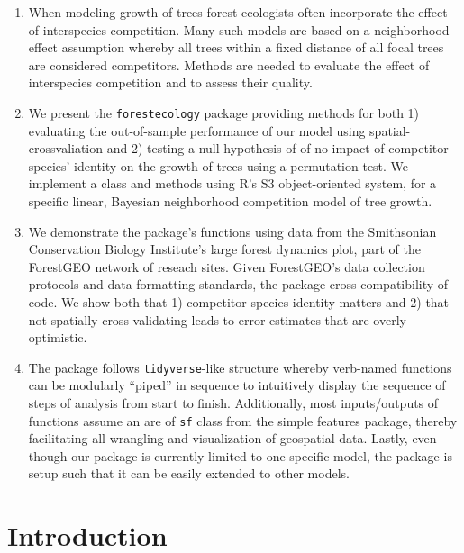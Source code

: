 \documentclass[12pt]{article}
\providecommand{\tightlist}{%
  \setlength{\itemsep}{0pt}\setlength{\parskip}{0pt}}
\begin{document}
\begin{enumerate}
\def\labelenumi{\arabic{enumi}.}
\tightlist
\item
  When modeling growth of trees forest ecologists often incorporate the
  effect of interspecies competition. Many such models are based on a
  neighborhood effect assumption whereby all trees within a fixed
  distance of all focal trees are considered competitors. Methods are
  needed to evaluate the effect of interspecies competition and to
  assess their quality.
\item
  We present the \texttt{forestecology} package providing methods for
  both 1) evaluating the out-of-sample performance of our model using
  spatial-crossvaliation and 2) testing a null hypothesis of of no
  impact of competitor species' identity on the growth of trees using a
  permutation test. We implement a class and methods using R's S3
  object-oriented system, for a specific linear, Bayesian neighborhood
  competition model of tree growth.
\item
  We demonstrate the package's functions using data from the Smithsonian
  Conservation Biology Institute's large forest dynamics plot, part of
  the ForestGEO network of reseach sites. Given ForestGEO's data
  collection protocols and data formatting standards, the package
  cross-compatibility of code. We show both that 1) competitor species
  identity matters and 2) that not spatially cross-validating leads to
  error estimates that are overly optimistic.
\item
  The package follows \texttt{tidyverse}-like structure whereby
  verb-named functions can be modularly ``piped'' in sequence to
  intuitively display the sequence of steps of analysis from start to
  finish. Additionally, most inputs/outputs of functions assume an are
  of \texttt{sf} class from the simple features package, thereby
  facilitating all wrangling and visualization of geospatial data.
  Lastly, even though our package is currently limited to one specific
  model, the package is setup such that it can be easily extended to
  other models.
\end{enumerate}

\hypertarget{introduction}{%
\section{Introduction}\label{introduction}}
\end{document}
